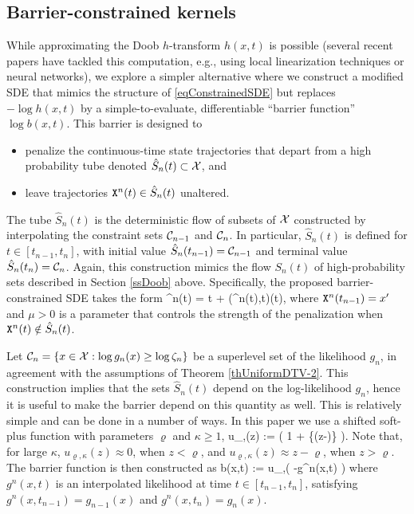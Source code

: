 \documentclass[onefignum,onetabnum]{siamonline250211}%
\begin{document}
%
\subsection{Barrier-constrained kernels} \label{ssBarrier}

While approximating the Doob $h$-transform $h(x,t)$ is possible (several recent papers \cite{Chopin23,Pieper-Sethmacher25,Pieper-Sethmacher25b,Pieper-Sethmacher25c,Eklund25} have tackled this computation, e.g., using local linearization techniques or neural networks), we explore a simpler alternative where we construct a modified SDE that mimics the structure of \eqref{eqConstrainedSDE} but replaces $-\log h(x,t)$ by a simple-to-evaluate, differentiable ``barrier function'' $\log b(x,t)$. This barrier is designed to 
\begin{itemize}
\item penalize the continuous-time state trajectories that depart from a high probability tube denoted $\hat S_n(t) \subset {\mathcal X}$, and
\item leave trajectories $\mathtt{X}^n(t) \in \hat S_n(t)$ unaltered. 
\end{itemize}
The tube $\hat S_n(t)$ is the deterministic flow of subsets of ${\mathcal X}$ constructed by interpolating the constraint sets ${\mathcal C}_{n-1}$ and ${\mathcal C}_n$. In particular, $\hat S_n(t)$ is defined for $t \in [t_{n-1},t_n]$, with initial value $\hat S_n(t_{n-1}) = {\mathcal C}_{n-1}$ and terminal value $\hat S_n(t_n) = {\mathcal C}_n$. Again, this construction mimics the flow $S_n(t)$ of high-probability sets described in Section \ref{ssDoob} above. Specifically, the proposed barrier-constrained SDE takes the form
\beq
\sd \X^n(t) =  \sd t + \sigma(\X^n(t),t)\sd \W(t),
\label{eqBarrierSDE}
\eeq
where $\mathtt{X}^n(t_{n-1})=x'$ and $\mu>0$ is a parameter that controls the strength of the penalization when $\mathtt{X}^n(t) \notin \hat S_n(t)$. 

Let ${\mathcal C}_n = \{ x\in{\mathcal X}: \log g_n(x) \ge \log \zeta_n \}$ be a superlevel set of the likelihood $g_n$, in agreement with the assumptions of Theorem \ref{thUniformDTV-2}. This construction implies that the sets $\hat S_n(t)$ depend on the log-likelihood $g_n$, hence it is useful to make the barrier depend on this quantity as well. This is relatively simple and can be done in a number of ways. In this paper we use a shifted soft-plus function with parameters $\varrho$ and $\kappa \ge 1$,
\beq
u_{\varrho,\kappa}(z) :=  \log\left(
    1 + \exp\{\kappa(z-\varrho)\}
\right).
\nn
\eeq
Note that, for large $\kappa$, $u_{\varrho,\kappa}(z) \approx 0$, when $z<\varrho$, and $u_{\varrho,\kappa}(z) \approx z-\varrho$, when $z>\varrho$. The barrier function is then constructed as
\beq
\log b(x,t) := u_{\varrho,\kappa}( -\log g^n(x,t) )
\label{eqBarrierFunction}
\eeq
where $g^n(x,t)$ is an interpolated likelihood at time $t \in [t_{n-1},t_n]$, satisfying $g^n(x,t_{n-1}) = g_{n-1}(x)$ and $g^n(x,t_n)=g_n(x)$.
\end{document}
